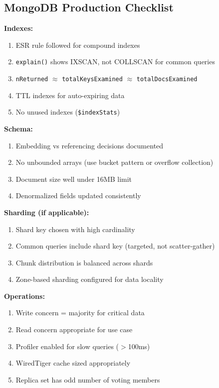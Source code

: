 \documentclass[12pt,a4paper]{article}
\begin{document}
\subsection{MongoDB Production Checklist}

\begin{tipbox}
\textbf{Indexes:}
\begin{enumerate}[label=$\square$]
    \item ESR rule followed for compound indexes
    \item \texttt{explain()} shows IXSCAN, not COLLSCAN for common queries
    \item \texttt{nReturned} $\approx$ \texttt{totalKeysExamined} $\approx$ \texttt{totalDocsExamined}
    \item TTL indexes for auto-expiring data
    \item No unused indexes (\texttt{\$indexStats})
\end{enumerate}

\textbf{Schema:}
\begin{enumerate}[label=$\square$]
    \item Embedding vs referencing decisions documented
    \item No unbounded arrays (use bucket pattern or overflow collection)
    \item Document size well under 16MB limit
    \item Denormalized fields updated consistently
\end{enumerate}

\textbf{Sharding (if applicable):}
\begin{enumerate}[label=$\square$]
    \item Shard key chosen with high cardinality
    \item Common queries include shard key (targeted, not scatter-gather)
    \item Chunk distribution is balanced across shards
    \item Zone-based sharding configured for data locality
\end{enumerate}

\textbf{Operations:}
\begin{enumerate}[label=$\square$]
    \item Write concern = majority for critical data
    \item Read concern appropriate for use case
    \item Profiler enabled for slow queries ($>$100ms)
    \item WiredTiger cache sized appropriately
    \item Replica set has odd number of voting members
\end{enumerate}
\end{tipbox}
\end{document}
